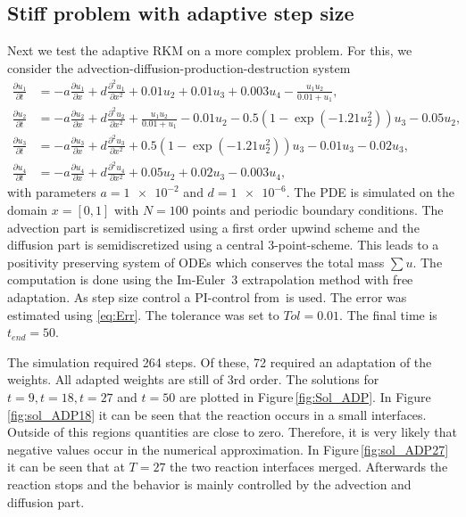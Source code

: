 \documentclass[a4paper]{article}
\numberwithin{equation}{section}
\theoremstyle{plain}
\theoremstyle{definition}
\numberwithin{theorem}{section}
\newcommand{\1}{\mathbbm{1}}
\begin{document}
\subsection{Stiff problem with adaptive step size}

Next we test the adaptive RKM on a more complex problem.
For this, we consider the advection-diffusion-production-destruction system  \cite{kopecz_comparison_2019}
\begin{subequations}
\label{eq:ADR}
\begin{align}
\frac{\partial u_1}{\partial t} &=-a \frac{\partial u_1}{\partial x} + d\frac{\partial^2 u_1}{\partial x ^2} + 0.01u_2 + 0.01 u_3 +0.003u_4 - \frac{u_1 u_2}{0.01+u_1}, \\
\frac{\partial u_2}{\partial t} &=-a \frac{\partial u_2}{\partial x} + d\frac{\partial^2 u_2}{\partial x ^2} + \frac{u_1u_2}{0.01+u_1} -0.01 u_2-0.5(1-\exp(-1.21 u_2^2)) u_3 -0.05 u_2, \\
\frac{\partial u_3}{\partial t} &=-a \frac{\partial u_3}{\partial x} + d\frac{\partial^2 u_3}{\partial x ^2} + 0.5(1-\exp(-1.21u_2^2)) u_3 - 0.01 u_3 -0.02 u_3, \\
\frac{\partial u_4}{\partial t} &=-a \frac{\partial u_4}{\partial x} + d\frac{\partial^2 u_4}{\partial x ^2} + 0.05 u_2 + 0.02 u_3 - 0.003u_4,
\end{align}
\end{subequations}
with parameters $a=\num{1e-2} $ and $ d=\num{1e-6}$.
The PDE is simulated on the domain $x = [0,1]$ with $N=100$ points and periodic boundary conditions.
The advection part is semidiscretized using a first order upwind scheme and the diffusion part is semidiscretized using a central 3-point-scheme. This leads to a positivity preserving system of ODEs which conserves the total mass $\sum u$.
The computation is done using the Im-Euler~3 extrapolation
method with free adaptation.
As step size control a PI-control from\,\cite{hairer_solving_1996} is used. The error was estimated using \eqref{eq:Err}. The tolerance was set to $Tol = 0.01$.
The final time is $t_{end} = 50$.

The simulation required 264 steps. Of these, 72 required an adaptation of the weights.
All adapted weights are still of 3rd order.
The solutions for $t=9,t=18,t=27$ and $t=50$ are plotted in Figure\,\ref{fig:Sol_ADP}.
In Figure\,\ref{fig:sol_ADP18} it can be seen that the reaction occurs in a small interfaces.
Outside of this regions quantities are close to zero. Therefore, it is very likely that negative values occur in the numerical approximation.
In Figure\,\ref{fig:sol_ADP27} it can be seen that at $T=27$ the two reaction interfaces merged. Afterwards the reaction stops and the behavior is mainly controlled by the advection and diffusion part.
\end{document}
